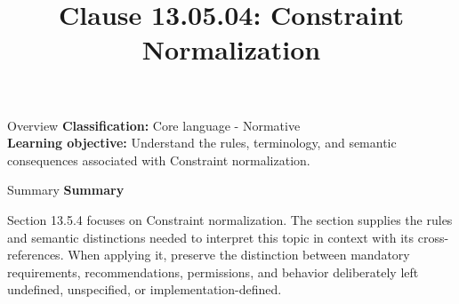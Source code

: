 \documentclass[10pt,letterpaper]{article}
\title{Clause 13.05.04: Constraint Normalization}
\author{}
\date{}
\begin{document}
\maketitle
\begin{CornellOverviewBox}{Overview}
\textbf{Classification:} Core language - Normative\\[2pt]
\textbf{Learning objective:} Understand the rules, terminology, and semantic consequences associated with Constraint normalization.
\end{CornellOverviewBox}\begin{CornellSummaryBox}{Summary}
{\sffamily\bfseries\color{Accent} Summary}\par\vspace{3pt}Section 13.5.4 focuses on Constraint normalization. The section supplies the rules and semantic distinctions needed to interpret this topic in context with its cross-references. When applying it, preserve the distinction between mandatory requirements, recommendations, permissions, and behavior deliberately left undefined, unspecified, or implementation-defined.
\end{CornellSummaryBox}
\end{document}
